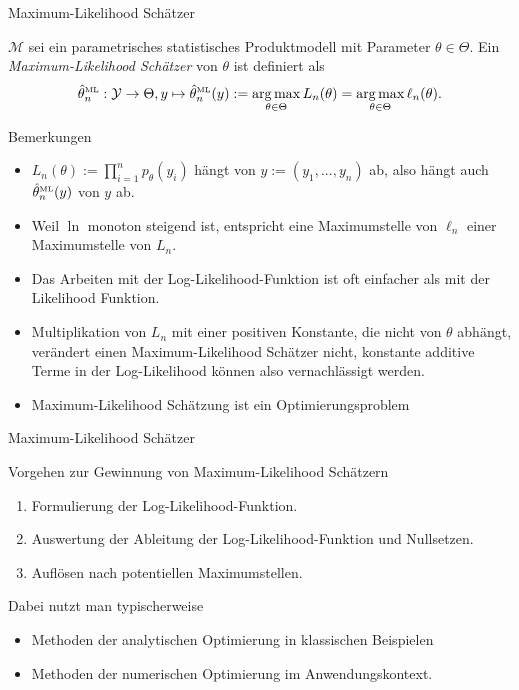 \documentclass[
  8pt,
  ignorenonframetext,
]{beamer}
\providecommand{\tightlist}{%
  \setlength{\itemsep}{0pt}\setlength{\parskip}{0pt}}
\DeclareMathOperator*{\argmax}{arg\,max}
\begin{document}
\begin{frame}{Maximum-Likelihood Schätzer}
\protect\hypertarget{maximum-likelihood-schuxe4tzer-1}{}
\small
\begin{definition}
\justifying
$\mathcal{M}$ sei ein parametrisches statistisches Produktmodell mit Parameter
$\theta \in \Theta$. Ein \textit{Maximum-Likelihood Schätzer} von $\theta$
ist definiert als
\begin{equation}
\hat{\theta}^{\mbox{\tiny ML}}_n : \mathcal{Y} \to \Theta,
y \mapsto \hat{\theta}^{\mbox{\tiny ML}}_n(y)
:= \argmax_{\theta \in \Theta} L_n(\theta)
=  \argmax_{\theta \in \Theta} \ell_n(\theta).
\end{equation}
\end{definition}

\footnotesize

Bemerkungen

\begin{itemize}
\tightlist
\item
  \justifying \(L_n(\theta) := \prod_{i=1}^n p_\theta(y_i)\) hängt von
  \(y := (y_1,...,y_n)\) ab, also hängt auch
  \(\hat{\theta}^{\mbox{\tiny ML}}_n(y)\) von \(y\) ab.
\item
  Weil \(\ln\) monoton steigend ist, entspricht eine Maximumstelle von
  \(\ell_n\) einer Maximumstelle von \(L_n\).
\item
  Das Arbeiten mit der Log-Likelihood-Funktion ist oft einfacher als mit
  der Likelihood Funktion.
\item
  Multiplikation von \(L_n\) mit einer positiven Konstante, die nicht
  von \(\theta\) abhängt, verändert einen Maximum-Likelihood Schätzer
  nicht, konstante additive Terme in der Log-Likelihood können also
  vernachlässigt werden.
\item
  Maximum-Likelihood Schätzung ist ein Optimierungsproblem
\end{itemize}
\end{frame}

\begin{frame}{Maximum-Likelihood Schätzer}
\protect\hypertarget{maximum-likelihood-schuxe4tzer-2}{}

Vorgehen zur Gewinnung von Maximum-Likelihood Schätzern

\begin{enumerate}
[(1)]
\tightlist
\item
  Formulierung der Log-Likelihood-Funktion.
\item
  Auswertung der Ableitung der Log-Likelihood-Funktion und Nullsetzen.
\item
  Auflösen nach potentiellen Maximumstellen.
\end{enumerate}

Dabei nutzt man typischerweise

\begin{itemize}
\tightlist
\item
  Methoden der analytischen Optimierung in klassischen Beispielen\\
\item
  Methoden der numerischen Optimierung im Anwendungskontext.
\end{itemize}
\end{frame}
\end{document}
